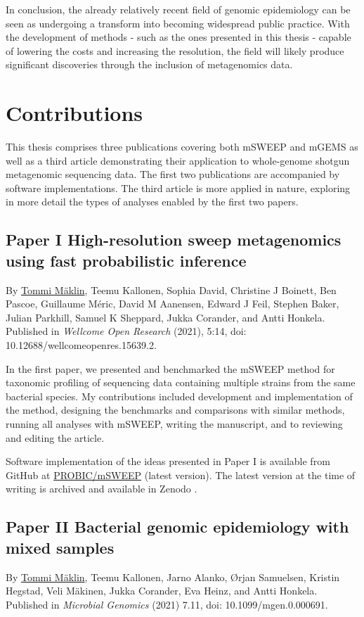 \documentclass[officiallayout]{tktla}
\begin{document}
In conclusion, the already relatively recent field of genomic
epidemiology can be seen as undergoing a transform into becoming
widespread public practice. With the development of methods - such as
the ones presented in this thesis - capable of lowering the costs and
increasing the resolution, the field will likely produce significant
discoveries through the inclusion of metagenomics data.

\section{Contributions}

This thesis comprises three publications covering both mSWEEP and
mGEMS as well as a third article demonstrating their application to
whole-genome shotgun metagenomic sequencing data. The first two
publications are accompanied by software implementations. The third
article is more applied in nature, exploring in more detail the types
of analyses enabled by the first two papers.

\subsection*{Paper I \textemdash High-resolution sweep metagenomics using fast probabilistic inference}
By \underline{Tommi Mäklin}, Teemu Kallonen, Sophia David, Christine J
Boinett, Ben Pascoe, Guillaume Méric, David M Aanensen, Edward J Feil,
Stephen Baker, Julian Parkhill, Samuel K Sheppard, Jukka Corander, and
Antti Honkela. Published in \textit{Wellcome Open Research} (2021),
5:14, doi: 10.12688/wellcomeopenres.15639.2.

In the first paper, we presented and benchmarked the mSWEEP method for
taxonomic profiling of sequencing data containing multiple strains
from the same bacterial species. My contributions included development
and implementation of the method, designing the benchmarks and
comparisons with similar methods, running all analyses with mSWEEP,
writing the manuscript, and to reviewing and editing the article.

Software implementation of the ideas presented in Paper I is
available from GitHub at
\href{https://github.com/PROBIC/mSWEEP}{PROBIC/mSWEEP} (latest
version). The latest version at the time of writing is archived and
available in Zenodo \citep{maklin_mSWEEP}.

\subsection*{Paper II \textemdash Bacterial genomic epidemiology with mixed samples}
By \underline{Tommi Mäklin}, Teemu Kallonen, Jarno Alanko, Ørjan
Samuelsen, Kristin Hegstad, Veli Mäkinen, Jukka Corander, Eva Heinz,
and Antti Honkela. Published in \textit{Microbial Genomics} (2021)
7.11, doi: 10.1099/mgen.0.000691.
\end{document}
